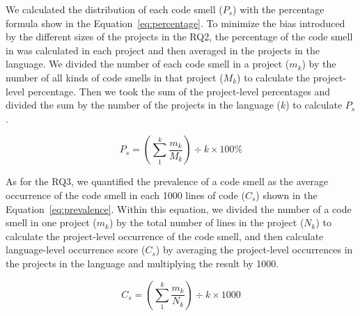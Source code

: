 We calculated the distribution of each code smell ($P_{s}$) with the percentage formula show in the Equation~\ref{eq:percentage}.
To minimize the bias introduced by the different sizes of the projects in the
RQ2, the percentage of the code smell in was calculated in each project and then averaged in the projects in the language.
We divided the number of each code smell in a project
($m_{k}$) by the number of all kinds of code smells in that project
({$M_{k}$}) to calculate the project-level percentage. Then we took
the sum of the project-level percentages and
divided the sum by the number of the projects in the language ($k$) to calculate
$P_{s}$.

\vspace{-1em}

\begin{equation}
P_{s} = \left( \sum_{1}^{k}\frac{{m_{k}}}{M_{k}} \right) \div {k} \times 100\%
\label{eq:percentage}
\end{equation}



As for the RQ3, we quantified the prevalence of a code smell as
the average occurrence of the code smell in each 1000 lines of code
($C_{s}$) shown in the Equation~\ref{eq:prevalence}.
Within this equation, we divided the number of a code smell in
one project ($m_{k}$) by the total number of lines in the project
($N_{k}$) to calculate the project-level occurrence of the code smell, and
then calculate language-level occurrence score ($C_{s}$) by averaging the project-level occurrences
in the projects in the language and multiplying the result by 1000.

\vspace{-1.0em}

\begin{equation}
C_{s} = \left( \sum_{1}^{k}{\frac{m_{k}}{N_{k}}} \right) \div k \times 1000
\label{eq:prevalence}
\end{equation}

